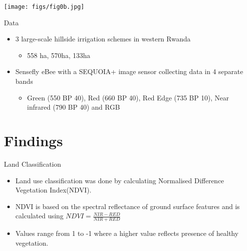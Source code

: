 \documentclass{beamer}
\begin{document}
\begin{frame}[noframenumbering]
	\begin{center}
		\texttt{[image: figs/fig0b.jpg]}
	\end{center}
\end{frame}

\begin{frame}{Data}
	\begin{itemize}
		\item 3 large-scale hillside irrigation schemes in western Rwanda
		\begin{itemize}
			\item 558 ha, 570ha, 133ha
		\end{itemize}
		\item Sensefly eBee with a SEQUOIA+ image sensor collecting data in 4 separate bands
		\begin{itemize}
			\item Green (550 BP 40), Red (660 BP 40), Red Edge (735 BP 10), Near infrared (790 BP 40) and RGB
		\end{itemize}	
	\end{itemize}		
\end{frame}

\section{Findings}

\begin{frame}{Land Classification}
	\begin{itemize}
		\item Land use classification was done by calculating Normalised Difference Vegetation Index(NDVI).
		\item NDVI is based on the spectral reflectance of ground surface features and is calculated using $NDVI = \frac{NIR - RED}{NIR + RED}$
		\item Values range from 1 to -1 where a higher value reflects presence of healthy vegetation. 		
	\end{itemize}
\end{frame}
\end{document}
